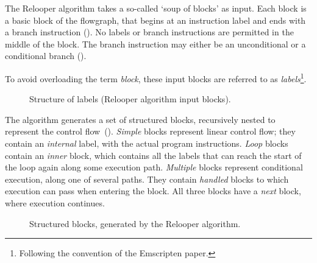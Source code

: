 \documentclass[00-main.tex]{subfiles}
\begin{document}

The Relooper algorithm takes a so-called `soup of blocks' as input.
Each block is a basic block of the flowgraph, that begins at an instruction label and ends with a branch instruction ().
No labels or branch instructions are permitted in the middle of the block.
The branch instruction may either be an unconditional or a conditional branch ().

To avoid overloading the term \emph{block}, these input blocks are referred to as \emph{labels}\footnote{Following the convention of the Emscripten paper.}.

\begin{figure}[b]
  \centering
  \caption{Structure of labels (Relooper algorithm input blocks).\vspace{-\baselineskip}}
  \label{fig:relooper input label structure} %
\end{figure}

The algorithm generates a set of structured blocks, recursively nested to represent the control flow~().
\emph{Simple} blocks represent linear control flow; they contain an \emph{internal} label, with the actual program instructions.
\emph{Loop} blocks contain an \emph{inner} block, which contains all the labels that can reach the start of the loop again along some execution path.
\emph{Multiple} blocks represent conditional execution, along one of several paths.
They contain \emph{handled} blocks to which execution can pass when entering the block.
All three blocks have a \emph{next} block, where execution continues.

\begin{figure}[t]
  \centering
  \caption{Structured blocks, generated by the Relooper algorithm.}
  \label{fig:relooper output blocks structure} %
\end{figure}

\end{document}
